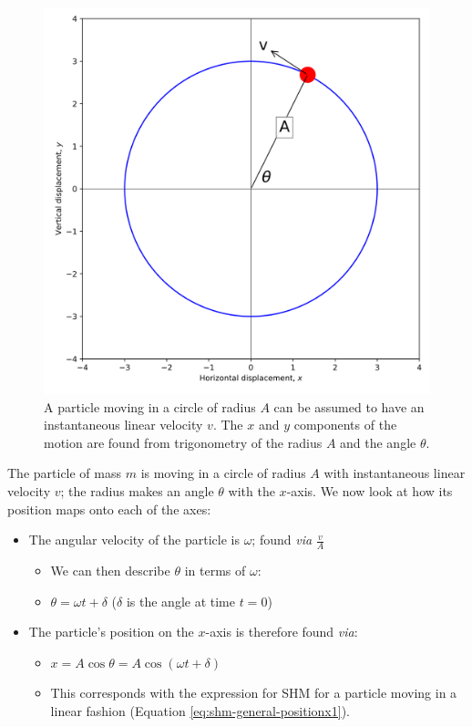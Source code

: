 \documentclass[
]{book}
\providecommand{\tightlist}{%
  \setlength{\itemsep}{0pt}\setlength{\parskip}{0pt}}
\begin{document}
\begin{figure}

{\centering \includegraphics[width=0.7\linewidth]{visualisations/ch1-shmcircular} 

}

\caption{A particle moving in a circle of radius $A$ can be assumed to have an instantaneous linear velocity $v$. The $x$ and $y$ components of the motion are found from trigonometry of the radius $A$ and the angle $θ$.}\label{fig:ch1-circularmotion1}
\end{figure}

The particle of mass \(m\) is moving in a circle of radius \(A\) with instantaneous linear velocity \(v\); the radius makes an angle \(\theta\) with the \(x\)-axis. We now look at how its position maps onto each of the axes:

\begin{itemize}
\tightlist
\item
  The angular velocity of the particle is \(\omega\); found \emph{via} \(\frac{v}{A}\)

  \begin{itemize}
  \tightlist
  \item
    We can then describe \(\theta\) in terms of \(\omega\):
  \item
    \(\theta = \omega t + \delta\) (\(\delta\) is the angle at time \(t=0\))
  \end{itemize}
\item
  The particle's position on the \(x\)-axis is therefore found \emph{via}:

  \begin{itemize}
  \tightlist
  \item
    \(x = A \cos \theta = A \cos (\omega t + \delta)\)
  \item
    This corresponds with the expression for SHM for a particle moving in a linear fashion (Equation \eqref{eq:shm-general-positionx1}).
  \end{itemize}
\end{itemize}
\end{document}
